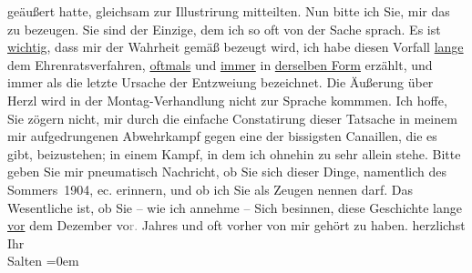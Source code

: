 \begin{ledgroupsized}[t]{13cm}
               geäußert hatte, gleichsam zur Illustrirung mitteilten.\pend
           \pstart
           Nun bitte ich Sie, mir das zu bezeugen. Sie sind der Einzige, dem ich so oft von der
               Sache sprach. Es ist \uline{wichtig}, dass mir der Wahrheit
               gemäß bezeugt wird, ich habe diesen Vorfall \uline{lange}{ } dem Ehrenratsverfahren, \uline{oftmals} und \uline{immer} in \uline{der{\pb}selben Form} erzählt, und immer als die letzte Ursache der Entzweiung
               bezeichnet.\pend
           \pstart
           Die Äußerung über Herzl wird in der Montag-Verhandlung nicht zur Sprache kommmen. Ich hoffe,
               Sie zögern nicht, mir durch die einfache Constatirung dieser Tatsache in meinem \introOben{}mir\introOben{} aufgedrungenen Abwehrkampf gegen eine der bissigsten
               Canaillen, die es gibt, beizustehen; in einem Kampf, in dem ich ohnehin zu sehr
               allein stehe. Bitte geben Sie mir pneumatisch Nachricht, ob Sie sich dieser Dinge,
               namentlich des Sommers 1904, ec. erinnern, und ob ich Sie
               als Zeugen nennen darf. Das Wesentliche ist, ob Sie – wie ich annehme – Sich
               besinnen, diese Geschichte lange \uline{vor} dem Dezember vo\textcolor{gray}{r.} Jahres und oft vorher von
               mir gehört zu haben.\pend
           \pstart
           herzlichst Ihr {\\[\baselineskip]}\spacefill\mbox{Salten}\pend
           \leftskip=0em{}
         
         \endnumbering{}\end{ledgroupsized}  \newcommand{\dateiname}{L03434}\newcommand{\titel}{Felix Salten an Arthur Schnitzler, [18.? 10. 1906]}\newcommand{\editorInnen}{Martin Anton Müller und Laura Untner}
      
